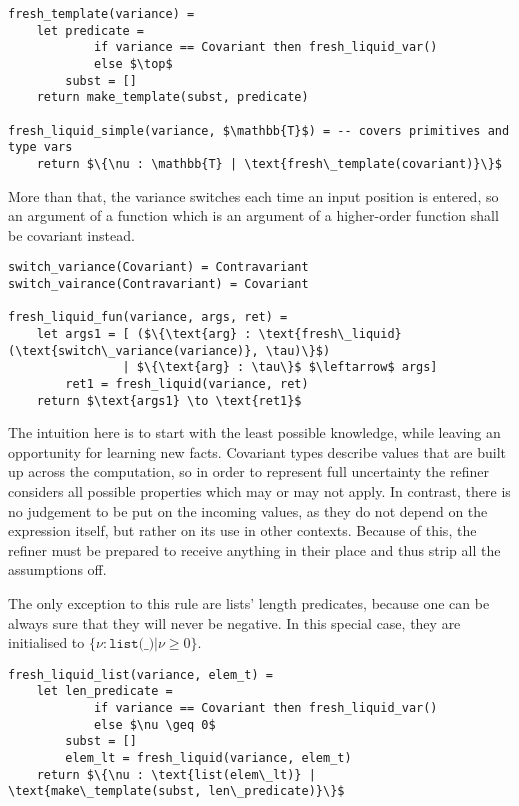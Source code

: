 \begin{lstlisting}[language=pseudocode]
fresh_template(variance) =
    let predicate =
            if variance == Covariant then fresh_liquid_var()
            else $\top$
        subst = []
    return make_template(subst, predicate)

fresh_liquid_simple(variance, $\mathbb{T}$) = -- covers primitives and type vars
    return $\{\nu : \mathbb{T} | \text{fresh\_template(covariant)}\}$
\end{lstlisting}

More than that, the variance switches each time an input position is entered, so
an argument of a function which is an argument of a higher-order function shall
be covariant instead.

\begin{lstlisting}[language=pseudocode]
switch_variance(Covariant) = Contravariant
switch_vairance(Contravariant) = Covariant

fresh_liquid_fun(variance, args, ret) =
    let args1 = [ ($\{\text{arg} : \text{fresh\_liquid}(\text{switch\_variance(variance)}, \tau)\}$)
                | $\{\text{arg} : \tau\}$ $\leftarrow$ args]
        ret1 = fresh_liquid(variance, ret)
    return $\text{args1} \to \text{ret1}$
\end{lstlisting}

The intuition here is to start with the least possible knowledge, while leaving
an opportunity for learning new facts. Covariant types describe values that are
built up across the computation, so in order to represent full uncertainty the
refiner considers all possible properties which may or may not apply. In
contrast, there is no judgement to be put on the incoming values, as they do not
depend on the expression itself, but rather on its use in other contexts.
Because of this, the refiner must be prepared to receive anything in their place
and thus strip all the assumptions off.

The only exception to this rule are lists' length predicates, because one can be
always sure that they will never be negative. In this special case, they are
initialised to $\{\nu : \texttt{list(\_)} | \nu \geq 0\}$.

\begin{lstlisting}[language=pseudocode]
fresh_liquid_list(variance, elem_t) =
    let len_predicate =
            if variance == Covariant then fresh_liquid_var()
            else $\nu \geq 0$
        subst = []
        elem_lt = fresh_liquid(variance, elem_t)
    return $\{\nu : \text{list(elem\_lt)} | \text{make\_template(subst, len\_predicate)}\}$
\end{lstlisting}

